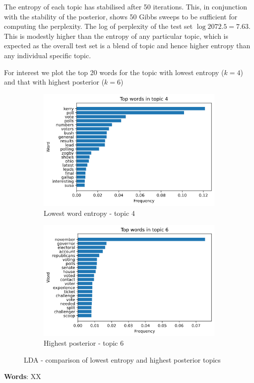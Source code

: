 \documentclass[]{article}
\begin{document}
The entropy of each topic has stabilised after 50 iterations. This, in conjunction with the stability of the posterior, shows 50 Gibbs sweeps to be sufficient for computing the perplexity. The log of perplexity of the test set $\log 2072.5 = 7.63$. This is modestly higher than the entropy of any particular topic, which is expected as the overall test set is a blend of topic and hence higher entropy than any individual specific topic.

For interest we plot the top 20 words for the topic with lowest entropy ($k=4$) and that with highest posterior ($k=6$) 
%
\begin{figure}[!h]
	\begin{subfigure}{0.5\linewidth}
		\centering
		\includegraphics[width=\linewidth]{topic-4-words.png}
		\caption{Lowest word entropy - topic 4}	
	\end{subfigure}
	\begin{subfigure}{0.5\linewidth}
		\centering
		\includegraphics[width=\linewidth]{topic-6-words.png}
		\caption{Highest posterior - topic 6}
	\end{subfigure}
	\caption{LDA - comparison of lowest entropy and highest posterior topics}
	\label{fig:top-topics}
\end{figure}

\textbf{Words}: XX
\end{document}
